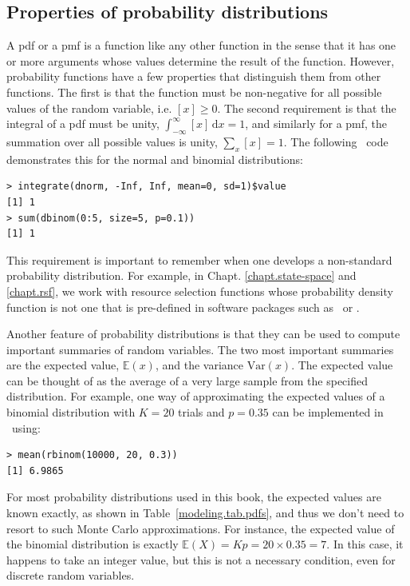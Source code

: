 \subsection{Properties of probability distributions}

A pdf or a pmf is a function like any other function
in the sense that it has one or more arguments whose values determine
the result of the function. However, probability functions have a few
properties that distinguish them from other functions.
The first is that the function
must be non-negative for all possible values of the random variable,
i.e. $[x] \geq 0$. The second requirement is that the integral of
a pdf must be unity, $\int_{-\infty}^{\infty} [x]\, \text{d}{x} = 1$, and similarly
for a pmf, the summation over all possible values is unity, $\sum_x [x]
= 1$. The following \R~code demonstrates
this for the normal and binomial distributions:
\begin{verbatim}
> integrate(dnorm, -Inf, Inf, mean=0, sd=1)$value
[1] 1
> sum(dbinom(0:5, size=5, p=0.1))
[1] 1
\end{verbatim}
This requirement is important to remember when one  develops a
non-standard probability distribution. For example, in Chapt.
\ref{chapt.state-space} and \ref{chapt.rsf},
we work with resource selection functions whose probability
density function is not one that is pre-defined in software packages
such as \R~or \bugs.

Another feature of probability distributions is that they can be used
to compute important summaries of random variables. The two most
important summaries are the expected value, $\mathbb{E}(x)$,
and the variance $\text{Var}(x)$. The expected value
can be thought of as the average
of a very large sample from the specified distribution. For
example,
one way of approximating the expected values of a binomial
distribution with $K=20$ trials and $p=0.35$ can be implemented in \R~using:
\begin{verbatim}
> mean(rbinom(10000, 20, 0.3))
[1] 6.9865
\end{verbatim}
For most probability distributions used in this book, the expected
values are known exactly, as shown in Table~\ref{modeling.tab.pdfs}, and
thus we don't need to resort to such Monte Carlo approximations. For instance, the
expected value of the binomial distribution is exactly $\mathbb{E}(X) = Kp =
20 \times 0.35 = 7$. In this case, it happens to take an integer
value, but this is not a necessary condition, even for discrete random
variables.

